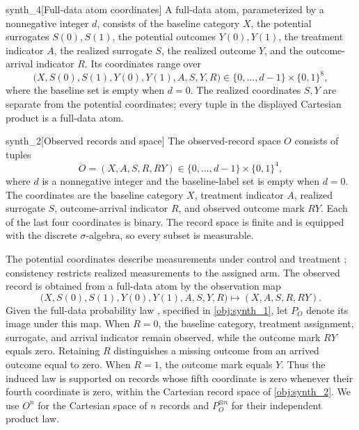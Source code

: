 \documentclass[11pt]{article}
\begin{document}
\begin{definitionv}{synth_4}[Full-data atom coordinates]
A full-data atom, parameterized by a nonnegative integer \(d\), consists of the baseline category \(X\), the potential surrogates \(S(0),S(1)\), the potential outcomes \(Y(0),Y(1)\), the treatment indicator \(A\), the realized surrogate \(S\), the realized outcome \(Y\), and the outcome-arrival indicator \(R\). Its coordinates range over
\[
\bigl(X,S(0),S(1),Y(0),Y(1),A,S,Y,R\bigr)
\in \{0,\ldots,d-1\}\times\{0,1\}^{8},
\]
where the baseline set is empty when \(d=0\). The realized coordinates \(S,Y\) are separate from the potential coordinates; every tuple in the displayed Cartesian product is a full-data atom.
\end{definitionv}

\begin{definitionv}{synth_2}[Observed records and space]
The observed-record space \(O\) consists of tuples
\[
O=(X,A,S,R,RY)\in \{0,\ldots,d-1\}\times\{0,1\}^{4},
\]
where \(d\) is a nonnegative integer and the baseline-label set is empty when \(d=0\). The coordinates are the baseline category \(X\), treatment indicator \(A\), realized surrogate \(S\), outcome-arrival indicator \(R\), and observed outcome mark \(RY\). Each of the last four coordinates is binary. The record space is finite and is equipped with the discrete \(\sigma\)-algebra, so every subset is measurable.
\end{definitionv}

The potential coordinates describe measurements under control and treatment \citep{Rubin1974}; consistency restricts realized measurements to the assigned arm. The observed record  is obtained from a full-data atom by the observation map
\[
\bigl(X,S(0),S(1),Y(0),Y(1),A,S,Y,R\bigr)
\longmapsto (X,A,S,R,RY).
\]
Given the full-data probability law , specified in \cref{obj:synth_1}, let \(P_O\) denote its image under this map. When \(R=0\), the baseline category, treatment assignment, surrogate, and arrival indicator remain observed, while the outcome mark \(RY\) equals zero. Retaining \(R\) distinguishes a missing outcome from an arrived outcome equal to zero. When \(R=1\), the outcome mark equals \(Y\). Thus the induced law is supported on records whose fifth coordinate is zero whenever their fourth coordinate is zero, within the Cartesian record space of \cref{obj:synth_2}. We use \(O^n\) for the Cartesian space of \(n\) records and \(P_O^{\otimes n}\) for their independent product law.
\end{document}
